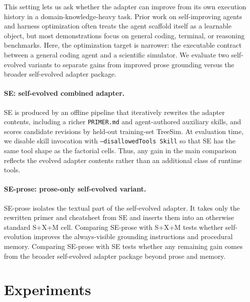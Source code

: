 \documentclass{article}
\begin{document}
This setting lets us ask whether the adapter can improve from its own execution history in a domain-knowledge-heavy task. 
Prior work on self-improving agents and harness optimization often treats the agent scaffold itself as a learnable object, but most demonstrations focus on general coding, terminal, or reasoning benchmarks. 
Here, the optimization target is narrower: the executable contract between a general coding agent and a scientific simulator. 
We evaluate two self-evolved variants to separate gains from improved prose grounding versus the broader self-evolved adapter package.

\paragraph{SE: self-evolved combined adapter.}
SE is produced by an offline pipeline that iteratively rewrites the adapter contents, including a richer \texttt{PRIMER.md} and agent-authored auxiliary skills, and scores candidate revisions by held-out training-set TreeSim. 
At evaluation time, we disable skill invocation with \texttt{--disallowedTools Skill} so that SE has the same tool shape as the factorial cells. 
Thus, any gain in the main comparison reflects the evolved adapter contents rather than an additional class of runtime tools.

\paragraph{SE-prose: prose-only self-evolved variant.}
SE-prose isolates the textual part of the self-evolved adapter. 
It takes only the rewritten primer and cheatsheet from SE and inserts them into an otherwise standard S+X+M cell. 
Comparing SE-prose with S+X+M tests whether self-evolution improves the always-visible grounding instructions and procedural memory. 
Comparing SE-prose with SE tests whether any remaining gain comes from the broader self-evolved adapter package beyond prose and memory.


\section{Experiments}
\label{sec:eval}

\end{document}
